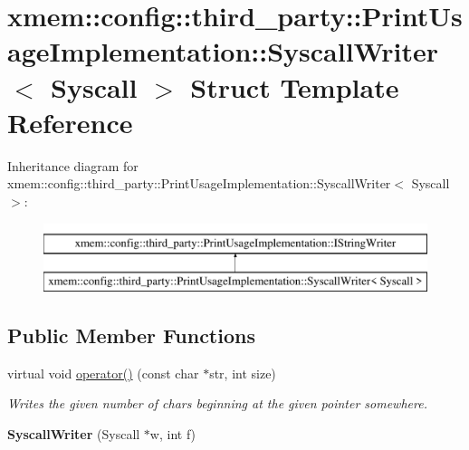 \hypertarget{structxmem_1_1config_1_1third__party_1_1_print_usage_implementation_1_1_syscall_writer}{}\section{xmem\+:\+:config\+:\+:third\+\_\+party\+:\+:Print\+Usage\+Implementation\+:\+:Syscall\+Writer$<$ Syscall $>$ Struct Template Reference}
\label{structxmem_1_1config_1_1third__party_1_1_print_usage_implementation_1_1_syscall_writer}
Inheritance diagram for xmem\+:\+:config\+:\+:third\+\_\+party\+:\+:Print\+Usage\+Implementation\+:\+:Syscall\+Writer$<$ Syscall $>$\+:\begin{figure}[H]
\begin{center}
\leavevmode
\includegraphics[height=2.000000cm]{structxmem_1_1config_1_1third__party_1_1_print_usage_implementation_1_1_syscall_writer}
\end{center}
\end{figure}
\subsection*{Public Member Functions}
\begin{DoxyCompactItemize}
\item 
\hypertarget{structxmem_1_1config_1_1third__party_1_1_print_usage_implementation_1_1_syscall_writer_abe35fdd4b67e221c5d6a3972a4970fb3}{}virtual void \hyperlink{structxmem_1_1config_1_1third__party_1_1_print_usage_implementation_1_1_syscall_writer_abe35fdd4b67e221c5d6a3972a4970fb3}{operator()} (const char $\ast$str, int size)\label{structxmem_1_1config_1_1third__party_1_1_print_usage_implementation_1_1_syscall_writer_abe35fdd4b67e221c5d6a3972a4970fb3}

\begin{DoxyCompactList}\small\item\em Writes the given number of chars beginning at the given pointer somewhere. \end{DoxyCompactList}\item 
\hypertarget{structxmem_1_1config_1_1third__party_1_1_print_usage_implementation_1_1_syscall_writer_a0787970dd79c70174d96b4ac9a05cacd}{}{\bfseries Syscall\+Writer} (Syscall $\ast$w, int f)\label{structxmem_1_1config_1_1third__party_1_1_print_usage_implementation_1_1_syscall_writer_a0787970dd79c70174d96b4ac9a05cacd}

\end{DoxyCompactItemize}
